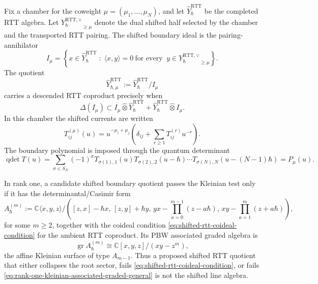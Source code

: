 \begin{theorem}
\label{thm:shifted-rtt-pairing-annihilator-kleinian-test}
Fix a chamber for the coweight
\(\mu=(\mu_1,\dots,\mu_N)\), and let
\(\widehat Y_{\hbar}^{\mathrm{RTT}}\) be the completed RTT algebra.
Let \({Y_{\hbar}^{\mathrm{RTT},\vee}}_{\ge\mu}\) denote the dual shifted
half selected by the chamber and the transported RTT pairing. The shifted
boundary ideal is the pairing-annihilator
\begin{equation}
\label{eq:shifted-rtt-pairing-annihilator}
I_\mu
=
\left\{
x\in \widehat Y_{\hbar}^{\mathrm{RTT}}
\;:\;
\langle x,y\rangle=0
\ \text{for every }\
y\in {Y_{\hbar}^{\mathrm{RTT},\vee}}_{\ge\mu}
\right\}.
\end{equation}
The quotient
\[
\widehat Y_{\hbar,\mu}^{\mathrm{RTT}}
:=
\widehat Y_{\hbar}^{\mathrm{RTT}}/I_\mu
\]
carries a descended RTT coproduct precisely when
\begin{equation}
\label{eq:shifted-rtt-coideal-condition}
\Delta(I_\mu)
\subset
I_\mu\widehat\otimes \widehat Y_{\hbar}^{\mathrm{RTT}}
+
\widehat Y_{\hbar}^{\mathrm{RTT}}\widehat\otimes I_\mu .
\end{equation}
In this chamber the shifted currents are written
\begin{equation}
\label{eq:shifted-rtt-local-generators}
T_{ij}^{(\mu)}(u)
=
u^{-\mu_i+\mu_j}
\left(
\delta_{ij}+\sum_{r\ge1}T_{ij}^{(r)}u^{-r}
\right).
\end{equation}
The boundary polynomial is imposed through the quantum determinant
\begin{equation}
\label{eq:shifted-rtt-qdet-polynomial}
\operatorname{qdet}T(u)
=
\sum_{\sigma\in S_N}(-1)^\sigma
T_{\sigma(1),1}(u)
T_{\sigma(2),2}(u-\hbar)
\cdots
T_{\sigma(N),N}(u-(N-1)\hbar)
=P_\mu(u).
\end{equation}

In rank one, a candidate shifted boundary quotient passes the Kleinian
test only if it has the determinantal/Casimir form
\begin{equation}
\label{eq:rank-one-quantized-kleinian-boundary}
A_{\hbar}^{(m)}
:=
\mathbb C\langle x,y,z\rangle
\Big/
\left(
[z,x]-\hbar x,\,
[z,y]+\hbar y,\,
yx-\prod_{a=0}^{m-1}(z-a\hbar),\,
xy-\prod_{a=1}^{m}(z+a\hbar)
\right),
\end{equation}
for some \(m\ge2\), together with the coideal condition
\eqref{eq:shifted-rtt-coideal-condition} for the ambient RTT coproduct.
Its PBW associated graded algebra is
\begin{equation}
\label{eq:rank-one-kleinian-associated-graded-general}
\operatorname{gr}A_{\hbar}^{(m)}
\cong
\mathbb C[x,y,z]/(xy-z^m),
\end{equation}
the affine Kleinian surface of type \(A_{m-1}\). Thus a proposed shifted
RTT quotient that either collapses the root sector, fails
\eqref{eq:shifted-rtt-coideal-condition}, or fails
\eqref{eq:rank-one-kleinian-associated-graded-general} is not the
shifted line algebra.
\end{theorem}


